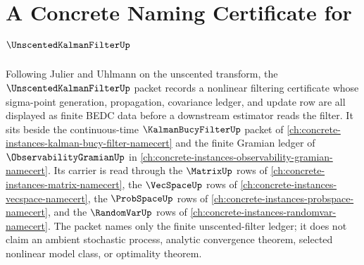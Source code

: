 \chapter{A Concrete Naming Certificate for $\UnscentedKalmanFilterUp$}
\label{ch:concrete-instances-unscented-kalman-filter-namecert}

Following Julier and Uhlmann on the unscented transform, the $\UnscentedKalmanFilterUp$ packet records a nonlinear filtering certificate whose sigma-point generation, propagation, covariance ledger, and update row are all displayed as finite BEDC data before a downstream estimator reads the filter. It sits beside the continuous-time $\KalmanBucyFilterUp$ packet of \autoref{ch:concrete-instances-kalman-bucy-filter-namecert} and the finite Gramian ledger of $\ObservabilityGramianUp$ in \autoref{ch:concrete-instances-observability-gramian-namecert}. Its carrier is read through the $\MatrixUp$ rows of \autoref{ch:concrete-instances-matrix-namecert}, the $\VecSpaceUp$ rows of \autoref{ch:concrete-instances-vecspace-namecert}, the $\ProbSpaceUp$ rows of \autoref{ch:concrete-instances-probspace-namecert}, and the $\RandomVarUp$ rows of \autoref{ch:concrete-instances-randomvar-namecert}. The packet names only the finite unscented-filter ledger; it does not claim an ambient stochastic process, analytic convergence theorem, selected nonlinear model class, or optimality theorem.


